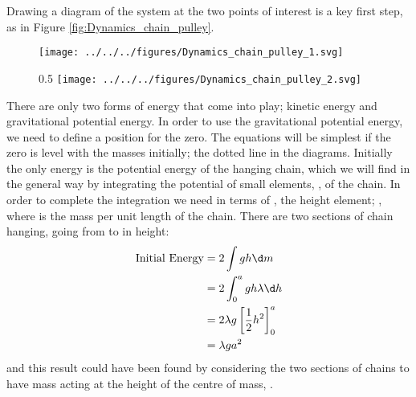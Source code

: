 

\begin{problem} %
{ }
{}
{Drawing a diagram of the system at the two points of interest is a key first step, as in Figure \ref{fig:Dynamics_chain_pulley}.

\begin{figure}[h]
  \centering
 	\texttt{[image: ../../../figures/Dynamics\_chain\_pulley\_1.svg]}
	\caption{}\label{fig:Dynamics_chain_pulley_1}
\end{figure}
\begin{figure}{0.5\textwidth}
	\centering
	\texttt{[image: ../../../figures/Dynamics\_chain\_pulley\_2.svg]}
	\caption{}\label{fig:Dynamics_chain_pulley_2}
\end{figure}

There are only two forms of energy that come into play; kinetic energy and gravitational potential energy. In order to use the gravitational potential energy, we need to define a position for the zero. The equations will be simplest if the zero is level with the masses initially; the dotted line in the diagrams. Initially the only energy is the potential energy of the hanging chain, which we will find in the general way by integrating the potential of small elements, , of the chain. In order to complete the integration we need  in terms of , the height element; , where \vari{\lambda} is the mass per unit length of the chain. There are two sections of chain hanging, going from  to  in height:
\begin{eqnarray*} 
\text{Initial Energy} &= 2 \int gh \d m \\ 
&= 2 \int_{0}^{a} gh \lambda \d h \\ 
&= 2\lambda g\left[\frac{1}{2}h^{2}\right]_{0}^{a} \\ 
&= \lambda ga^{2} 
\end{eqnarray*}
and this result could have been found by considering the two sections of chains to have mass  acting at the height of the centre of mass, .

}
\end{problem}

